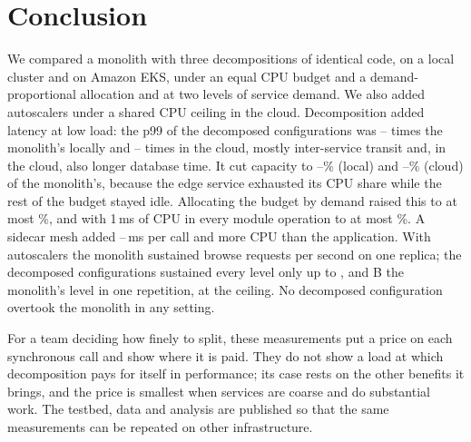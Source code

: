 \section{Conclusion}
\label{sec:conclusion}

We compared a monolith with three decompositions of identical code, on a local cluster and on Amazon EKS, under an
equal CPU budget and a demand-proportional allocation and at two levels of service demand.
We also added autoscalers under a shared CPU ceiling in the cloud.
Decomposition added latency at low load: the p99 of the decomposed configurations was --
times the monolith's locally and -- times in the cloud, mostly inter-service transit and, in the cloud, also longer database time.
It cut capacity to --\% (local) and --\%
(cloud) of the monolith's, because the edge service exhausted its CPU share while the rest of the budget stayed
idle. Allocating the budget by demand raised this to at most \%, and with 1\,ms of CPU in every
module operation to at most \%. A sidecar mesh added
--\,ms per call and more CPU than the application. With autoscalers the
monolith sustained  browse requests per second on one replica; the decomposed
configurations sustained every level only up to , and B the monolith's level in one
repetition, at the ceiling. No decomposed configuration overtook the monolith
in any setting.

For a team deciding how finely to split, these measurements put a price on each synchronous call and show where it
is paid. They do not show a load at which decomposition pays for itself in performance; its case rests on the other
benefits it brings, and the price is smallest when services are coarse and do substantial work. The testbed, data
and analysis are published so that the same measurements can be repeated on other infrastructure.
